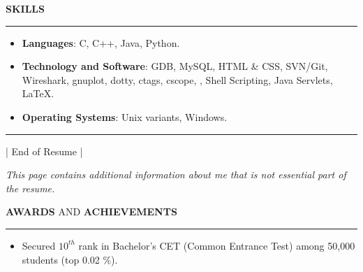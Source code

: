 \documentclass[a4paper, 10pt]{extarticle}
\begin{document}
\begin{large}
\begin{itemize}
\end{itemize}
\vspace{.1cm}
\vspace{-0.2cm}
\begin{flushleft}
{\LARGE{\textbf{S}}\Large{\textbf{KILLS}}}
\end{flushleft}

\vspace{-.1cm} \hrule \vspace{-.1cm}

\begin{itemize}
    \setlength\itemsep{-0.03 cm}
    \item{\textbf{Languages}: C, C++, Java, Python.}
    
    \item{\textbf{Technology and Software}: GDB, MySQL, HTML \& CSS, SVN/Git, Wireshark, gnuplot, dotty, ctags, cscope, , Shell Scripting, Java Servlets, \LaTeX{}.}
    
    \item{\textbf{Operating Systems}: Unix variants, Windows.}
    
\end{itemize} 

\vspace{0.1cm}
\hrule \vspace{-.2cm}
\begin{center}
\tiny{| End of Resume |}
\end{center}


\newpage

\begin{center}
 \large{\textit{This page contains additional information about me that is not  essential part of the resume.}}
\end{center}
\vspace{.2cm}
\begin{flushleft}
{\LARGE{\textbf{A}}\Large{\textbf{WARDS}} \large{AND} \LARGE{\textbf{A}}\Large{\textbf{CHIEVEMENTS}}}
\end{flushleft}
\vspace{-.2cm} \hrule \vspace{-.1cm}
\begin{itemize}
    \setlength\itemsep{-0.05 cm}
    \item{Secured $10^{th}$ rank in Bachelor's CET (Common Entrance Test) among 50,000 students (top 0.02 \%).}


\end{itemize}
\end{large}
\end{document}
